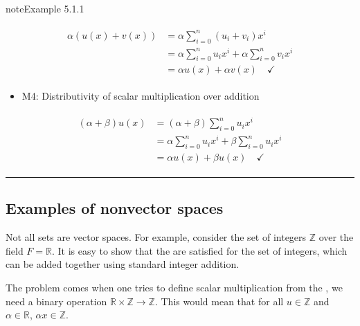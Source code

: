 \documentclass[letterpaper,10pt,english]{jupyterBook}
\begin{document}
\begin{sphinxadmonition}{note}{Example 5.1.1}
\begin{itemize}
\end{itemize}
\begin{equation*}
\begin{split} \begin{align*}
    \alpha (u(x) + v(x)) &= \alpha \sum_{i=0}^n (u_i + v_i) x^i \\
    &= \alpha \sum_{i=0}^n u_i x^i + \alpha \sum_{i=0}^n v_i x^i \\
    &= \alpha u(x) + \alpha v(x) \quad \checkmark
\end{align*} \end{split}
\end{equation*}\begin{itemize}
\item {} 
\sphinxAtStartPar
M4: Distributivity of scalar multiplication over addition

\end{itemize}
\begin{equation*}
\begin{split} \begin{align*}
    (\alpha + \beta) u(x) &= (\alpha + \beta) \displaystyle \sum_{i=0}^n u_i x^i \\
    &= \alpha \displaystyle \sum_{i=0}^n u_i x^i + \beta \displaystyle \sum_{i=0}^n u_i x^i \\
    &= \alpha u(x) + \beta u(x) \quad \checkmark
\end{align*} \end{split}
\end{equation*}\end{sphinxadmonition}


\bigskip\hrule\bigskip



\subsection{Examples of non\sphinxhyphen{}vector spaces}
\label{\detokenize{_pages/5.1_Vector_spaces_definitions:examples-of-non-vector-spaces}}
\sphinxAtStartPar
Not all sets are vector spaces. For example, consider the set of integers \(\mathbb{Z}\) over the field \(F=\mathbb{R}\). It is easy to show that the {\hyperref[\detokenize{_pages/5.1_Vector_spaces_definitions:vector-space-axioms}]{}} are satisfied for the set of integers, which can be added together using standard integer addition.

\sphinxAtStartPar
The problem comes when one tries to define scalar multiplication \sphinxhyphen{} from the {\hyperref[\detokenize{_pages/5.1_Vector_spaces_definitions:vector-space-definition}]{}}, we need a binary operation \(\mathbb{R} \times \mathbb{Z} \to \mathbb{Z}\). This would mean that for all \(u \in \mathbb{Z}\) and \(\alpha \in \mathbb{R}\), \(\alpha x\in \mathbb{Z}\).
\end{document}
